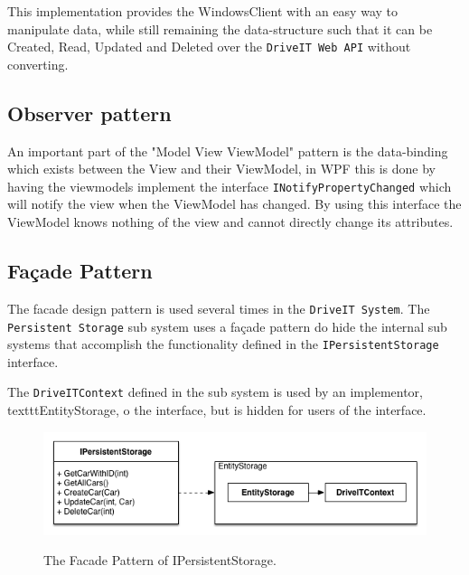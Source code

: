 This implementation provides the WindowsClient with an easy way to manipulate data, while still remaining the data-structure such that it can be Created, Read, Updated and Deleted over the \texttt{DriveIT Web API} without converting.
\subsection{Observer pattern}
An important part of the "Model View ViewModel" pattern is the data-binding which exists between the View and their ViewModel, in WPF this is done by having the viewmodels implement the interface \texttt{INotifyPropertyChanged} which will notify the view when the ViewModel has changed. By using this interface the ViewModel knows nothing of the view and cannot directly change its attributes.

\subsection{Façade Pattern}
The facade design pattern is used several times in the \texttt{DriveIT System}.
The \texttt{Persistent Storage} sub system uses a façade pattern do hide the internal sub systems that accomplish the functionality defined in the \texttt{IPersistentStorage} interface.

The \texttt{DriveITContext} defined in the sub system is used by an implementor, texttt{EntityStorage}, o the interface, but is hidden for users of the interface. 

\begin{figure}[H]
	\centering
	\includegraphics[scale=0.6]{Figures/FacadePatternPersistentStorage}\\
	\caption{The Facade Pattern of IPersistentStorage.}
	\label{fig:The Facade Pattern of IPersistentStorage.}
\end{figure}
